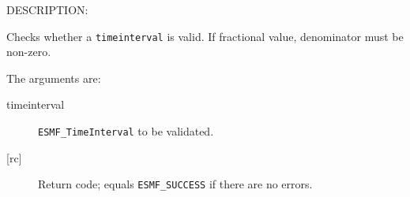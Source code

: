 {\sf DESCRIPTION:\\ }


       Checks whether a {\tt timeinterval} is valid.
       If fractional value, denominator must be non-zero.
  
       The arguments are:
       \begin{description}
       \item[timeinterval]
            {\tt ESMF\_TimeInterval} to be validated.
       \item[{[rc]}]
            Return code; equals {\tt ESMF\_SUCCESS} if there are no errors.
       \end{description}
  
\setlength{\parskip}{\oldparskip}
\setlength{\parindent}{\oldparindent}
\setlength{\baselineskip}{\oldbaselineskip}
